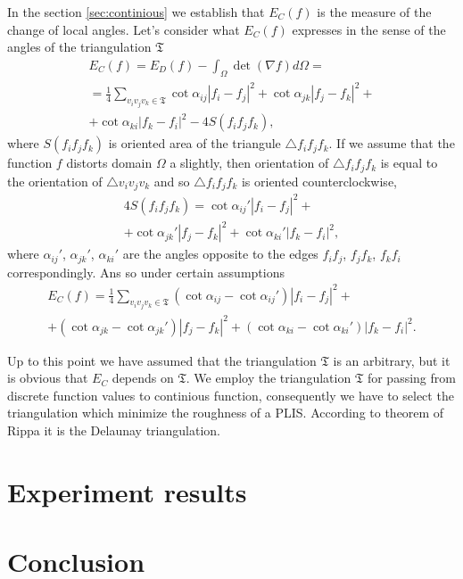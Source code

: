 \documentclass{article}
\begin{document}
In the section \ref{sec:continious} we establish that $E_C(f)$ is the measure of the change of local angles. Let's consider what $E_C(f)$ expresses in the sense of the angles of the triangulation $\mathfrak{T}$ 
\begin{multline*}
  E_C(f) = E_D(f) - \int_{\Omega} \det (\nabla f) d\Omega = \\ = \frac{1}{4} \sum_{v_i v_j v_k \in \mathfrak{T}} \cot{\alpha_{ij}}|f_i - f_j|^2 + \cot{\alpha_{jk}}|f_j - f_k|^2 + \\
  + \cot{\alpha_{ki}}|f_k - f_i|^2 - 4S(f_i f_j f_k),
\end{multline*}
where $S(f_i f_j f_k)$ is oriented area of the triangule $\triangle f_i f_j f_k$. If we assume that the function $f$ distorts domain $\Omega$ a slightly, then orientation of $\triangle f_i f_j f_k$ is equal to 
the orientation of $\triangle v_i v_j v_k$ and so $\triangle f_i f_j f_k$ is oriented counterclockwise,
\begin{multline*}
  4 S(f_i f_j f_k) = \cot{\alpha_{ij}'}|f_i - f_j|^2 + \\
  + \cot{\alpha_{jk}'}|f_j - f_k|^2 + \cot{\alpha_{ki}'}|f_k - f_i|^2,
\end{multline*}
where $\alpha_{ij}'$, $\alpha_{jk}'$, $\alpha_{ki}'$ are the angles opposite to the edges $f_i f_j$, $f_j f_k$, $f_k f_i$ correspondingly. Ans so under certain assumptions
\begin{multline*}
  E_C(f) = \frac{1}{4} \sum_{v_i v_j v_k \in \mathfrak{T}} (\cot{\alpha_{ij}} - \cot{\alpha_{ij}'})|f_i - f_j|^2 + \\
  + (\cot{\alpha_{jk}} - \cot{\alpha_{jk}'})|f_j - f_k|^2 + (\cot{\alpha_{ki}} - \cot{\alpha_{ki}'})|f_k - f_i|^2.
\end{multline*}

Up to this point we have assumed that the triangulation $\mathfrak{T}$ is an arbitrary, but it is obvious that $E_C$ depends on $\mathfrak{T}$. We employ the triangulation $\mathfrak{T}$ for passing 
from discrete function values to continious function, consequently we have to select the triangulation which minimize the roughness of a PLIS. According to theorem of Rippa \cite{Rippa, Chen} 
it is the Delaunay triangulation.  

\section{Experiment results}
\label{sec:results}

\section{Conclusion}
\label{sec:conclusion}



\end{document}
